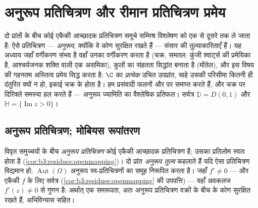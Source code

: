 \chapter{अनुरूप प्रतिचित्रण और रीमान प्रतिचित्रण प्रमेय}
\label{ch:b3:conformal}

दो प्रांतों के बीच कोई  एकैकी आच्छादक प्रतिचित्रण
समूचे सम्मिश्र विश्लेषण को एक से दूसरे तक ले जाता है: ऐसे
प्रतिचित्रण --- \emph{अनुरूप}, क्योंकि वे कोण सुरक्षित रखते हैं
---  संसार की तुल्याकारिताएँ हैं। यह अध्याय जहाँ
वर्गीकरण संभव है वहाँ उनका वर्गीकरण करता है (चक्र, समतल: कुंजी
श्वार्ट्स की प्रमेयिका है, आश्चर्यजनक शक्ति वाली एक असमिका),
 कुलों का संहतता सिद्धांत बनाता है (मोंतेल), और इस
विषय की गहनतम अस्तित्व प्रमेय सिद्ध करता है: $\C$ का
\emph{प्रत्येक}  उचित उपप्रांत, चाहे उसकी परिसीमा कितनी
ही दंतुरित क्यों न हो, इकाई चक्र के  होता है। हम
प्रसंवादी फलनों और  पर समाप्त करते हैं, और चक्र पर
दिरिक्ले समस्या हल करते हैं --- अनुरूप ज्यामिति का वैश्लेषिक
प्रतिफल। सर्वत्र $\mathbb D = D(0,1)$ और $\mathbb H = \{\operatorname{Im}z >
0\}$।

\section{अनुरूप प्रतिचित्रण; मोबियस रूपांतरण}

\begin{definition}\label{def:b3:conformal:conformal}
विवृत समुच्चयों के बीच \emph{अनुरूप प्रतिचित्रण} कोई  एकैकी आच्छादक प्रतिचित्रण है; उसका
प्रतिलोम स्वतः  होता है (\cref{cor:b3:residues:openmapping})। दो प्रांत \emph{अनुरूप
तुल्य} कहलाते हैं यदि ऐसा प्रतिचित्रण विद्यमान हो; $\operatorname{Aut}(\Omega)$ अनुरूप
स्व-प्रतिचित्रणों का समूह निरूपित करता है। जहाँ $f' \neq 0$ --- और एकैकी
$f$ के लिए सर्वत्र (\cref{cor:b3:residues:openmapping} की उपपत्ति) --- वहाँ अवकलज $f'(z) \neq 0$ से गुणन
है: अर्थात् एक समरूपता, अतः अनुरूप प्रतिचित्रण वक्रों के बीच के
कोण सुरक्षित रखते हैं, अभिविन्यास सहित।
\end{definition}

